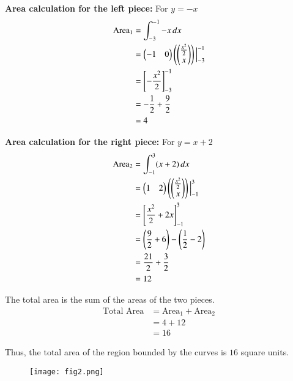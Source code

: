 \documentclass[journal]{IEEEtran}
\begin{document}
\textbf{Area calculation for the left piece:}
For $y=-x$ 
\begin{align}
    \text{Area}_1 &= \int_{-3}^{-1} -x \,dx \\
    &= \begin{pmatrix}-1 & 0\end{pmatrix} \left( \begin{pmatrix}\tfrac{x^2}{2} \\ x\end{pmatrix} \right) \Big|_{-3}^{-1} \\
    &= \left[ -\frac{x^2}{2} \right]_{-3}^{-1} \\
    &= -\frac{1}{2} + \frac{9}{2} \\
    &= 4
\end{align}

\textbf{Area calculation for the right piece:}
For $y=x+2$
\begin{align}
    \text{Area}_2 &= \int_{-1}^{3} (x+2) \,dx \\
    &= \begin{pmatrix}1 & 2\end{pmatrix} \left( \begin{pmatrix}\tfrac{x^2}{2} \\ x\end{pmatrix} \right) \Big|_{-1}^{3} \\
    &= \left[ \frac{x^2}{2} + 2x \right]_{-1}^{3} \\
    &= \left( \frac{9}{2} + 6 \right) - \left( \frac{1}{2} - 2 \right) \\
    &= \frac{21}{2} + \frac{3}{2} \\
    &= 12
\end{align}

The total area is the sum of the areas of the two pieces.
\begin{align}
    \text{Total Area} &= \text{Area}_1 + \text{Area}_2 \\
    &= 4 + 12 \\
    &= 16
\end{align}

Thus, the total area of the region bounded by the curves is $16$ square units.

\begin{figure}[H]
\centering
\texttt{[image: fig2.png]}
\caption{}
\label{fig:1}
\end{figure}
\end{document}
